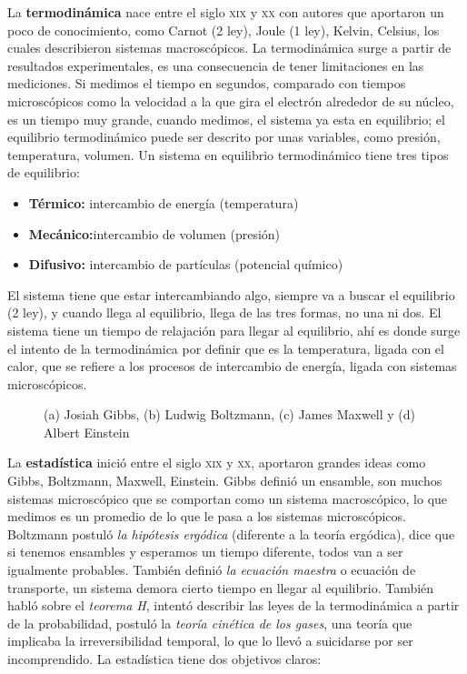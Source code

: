 \documentclass[11pt,fleqn]{book}
\begin{document}
La \textbf{termodinámica} nace entre el siglo \textsc{xix} y \textsc{xx} con autores que aportaron un poco de conocimiento, como Carnot (2 ley), Joule (1 ley), Kelvin, Celsius, los cuales describieron sistemas macroscópicos. La termodinámica surge a partir de resultados experimentales, es una consecuencia de tener limitaciones en las mediciones. Si medimos el tiempo en segundos, comparado con tiempos microscópicos como la velocidad a la que gira el electrón alrededor de su núcleo, es un tiempo muy grande, cuando medimos, el sistema ya esta en equilibrio; el equilibrio termodinámico puede ser descrito por unas variables, como presión, temperatura, volumen. Un sistema en equilibrio termodinámico tiene tres tipos de equilibrio:

\begin{itemize}
    \item \textbf{Térmico:} intercambio de energía (temperatura)
    \item \textbf{Mecánico:}intercambio de volumen (presión)
    \item \textbf{Difusivo:} intercambio de partículas (potencial químico)
\end{itemize}
     
El sistema tiene que estar intercambiando algo, siempre va a buscar el equilibrio (2 ley), y cuando llega al equilibrio, llega de las tres formas, no una ni dos. El sistema tiene un tiempo de relajación para llegar al equilibrio, ahí es donde surge el  intento de la termodinámica por definir que es la temperatura, ligada con el calor, que se refiere a los procesos de intercambio de energía, ligada con sistemas microscópicos.

\begin{figure}[H]
    \centering
    \caption{(a) Josiah Gibbs, (b) Ludwig Boltzmann, (c) James Maxwell y (d) Albert Einstein }
\end{figure}

La \textbf{estadística} inició entre el siglo \textsc{xix} y \textsc{xx}, aportaron grandes ideas como Gibbs, Boltzmann, Maxwell, Einstein. Gibbs definió un ensamble, son muchos sistemas microscópico que se comportan como un sistema macroscópico, lo que medimos es un promedio de lo que le pasa a los sistemas microscópicos. Boltzmann postuló \textit{la hipótesis ergódica} (diferente a la teoría ergódica), dice que si tenemos ensambles y esperamos un tiempo diferente, todos van a ser igualmente probables. También definió \textit{la ecuación maestra} o ecuación de transporte, un sistema demora cierto tiempo en llegar al equilibrio. También habló sobre el \textit{teorema H}, intentó describir las leyes de la termodinámica a partir de la probabilidad, postuló la \textit{teoría cinética de los gases}, una teoría que implicaba la irreversibilidad temporal, lo que lo llevó a suicidarse por ser incomprendido. La estadística tiene dos objetivos claros:
\end{document}
